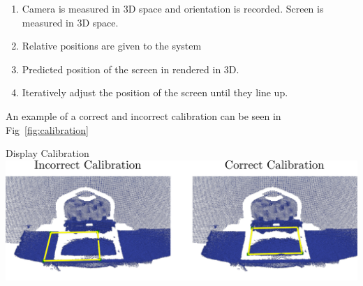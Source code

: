 \begin{enumerate}[itemsep=-0.25em]
	\item Camera is measured in 3D space and orientation is recorded. Screen is measured in 3D space. 
	\item Relative positions are given to the system 
	\item Predicted position of the screen in rendered in 3D.
	\item Iteratively adjust the position of the screen until they line up. 
\end{enumerate}

An example of a correct and incorrect calibration can be seen in Fig~\ref{fig:calibration}

\begin{figureBox}[label={fig:calibration}, width=0.8\linewidth]{Display Calibration}
    \includegraphics[width = 1.0\linewidth]{./implementation/figures/calibration.pdf}
\end{figureBox}
